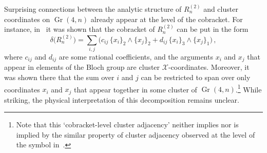 \documentclass[11pt]{article}
\DeclareMathOperator{\Gr}{Gr}
\def\x{\mathcal{X}}
\begin{document}
Surprising connections between the analytic structure of $R_n^{(2)}$\! and cluster coordinates on $\Gr(4,n)$ already appear at the level of the cobracket. For instance, in~\cite{Golden:2014pua} it was shown that the cobracket of $R_n^{(2)}$\! can be put in the form
\begin{equation} \label{eq:cobracket_decomp}
\delta\big(R^{(2)}_n\big) = \sum_{i,j} \Big(c_{ij} \, \{x_i\}_2 \wedge \{x_j\}_2 + d_{ij} \, \{x_i\}_3 \wedge \{x_j\}_1 \Big) \, ,
\end{equation}
where $c_{ij}$ and $d_{ij}$ are some rational coefficients, and the arguments $x_i$ and $x_j$ that appear in elements of the Bloch group are cluster $\x$-coordinates. Moreover, it was shown there that the sum over $i$ and $j$ can be restricted to span over only coordinates $x_i$ and $x_j$ that appear together in some cluster of $\Gr(4,n)$.\footnote{Note that this `cobracket-level cluster adjacency' neither implies nor is implied by the similar property of cluster adjacency observed at the level of the symbol in~\cite{Drummond:2017ssj}.} While striking, the physical interpretation of this decomposition remains unclear.
\end{document}
